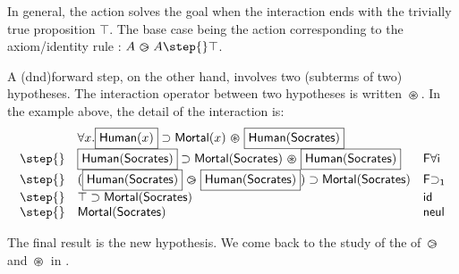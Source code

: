 In general, the action solves the goal when the interaction ends with
the trivially true proposition $\top$. The base case being the action
corresponding to the axiom/identity rule : $A\back A \step{} \top$.

A \kl(dnd){forward} step, on the other hand, involves two (subterms of two)
hypotheses. The interaction operator between two hypotheses is written
$\operatorname{\,\varoast\,}$. In the example above, the detail of the interaction is:
$$
  \begin{array}{lll}
    &  \forall x .\select{\human(x)}\limp\mortal(x) \forw \select{\human(\socrates)}&\\
    \step{} & \select{\human(\socrates)}\limp\mortal(\socrates) \forw \select{\human(\socrates)}& \mathsf{F \forall i}\\
    \step{} & (\select{\human(\socrates)}\back \select{\human(\socrates)} )\limp\mortal(\socrates) &\mathsf{F{\limp}_1}\\
    \step{} & \top \limp\mortal(\socrates) &\mathsf{id}\\
    \step{} & \mortal(\socrates) & \mathsf{neul}\\
  \end{array}
$$

The final result is the new hypothesis. We come back to the study of the  of ${\operatorname{\,\varogreaterthan\,}}$ and ${\operatorname{\,\varoast\,}}$ in .



